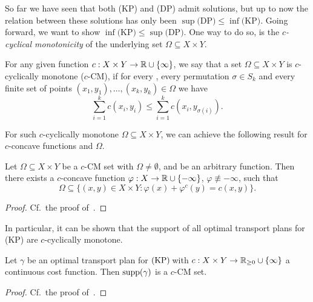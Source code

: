 So far we have seen that both (KP) and (DP) admit solutions, but up to now the relation between these solutions has only been $\sup \text{(DP)} \le \inf \text{(KP)}$. Going forward, we want to show $\inf \text{(KP)} \le \sup \text{(DP)}$. One way to do so, is the \textit{$c$-cyclical monotonicity} of the underlying set $\Omega \subseteq X \times Y$.

\begin{definition}\label{c-CM}
	For any given function $\map[c]{X \times{} Y}{\R \cup \{ \infty \}}$, we say that a set $\Omega \subseteq X \times Y$ is $c$-cyclically monotone ($c$-CM), if for every \NinN[k], every permutation $\sigma \in S_k$ and every finite set of points $(x_1, y_1), \dots, (x_k, y_k) \in \Omega$ we have
	\[ \sum\limits_{i = 1}^k c(x_i, y_i) \le \sum\limits_{i = 1}^k c(x_i, y_{\sigma(i)}). \]
\end{definition}

For such $c$-cyclically monotone $\Omega \subseteq X \times Y$, we can achieve the following result for $c$-concave functions and $\Omega$.

\begin{lemma}\label{c-CM-c-ConcExist}
	Let $\Omega \subseteq X \times Y$ be a $c$-CM set with $\Omega \neq \emptyset$, and  be an arbitrary function. Then there exists a $c$-concave function $\map[\varphi]{X}{\R \cup \{ - \infty \}}$, $\varphi \not\equiv -\infty$, such that
	\[ \Omega \subseteq \big\{ (x, y) \in X \times Y : \varphi(x) + \varphi^c(y) = c(x, y) \big\}. \]
\end{lemma}

\begin{proof}
	Cf.~the proof of\ \cite[Theorem~1.37]{San2015}.
\end{proof}

In particular, it can be shown that the support of all optimal transport plans for (KP) are $c$-cyclically monotone.

\begin{lemma}\label{OTPlanc-CM}
	Let $\gamma$ be an optimal transport plan for$\text{\normalfont\ (KP)\,}$with $\map[c]{X \times Y}{\RZero \cup \{ \infty \}}$ a continuous cost function. Then $\text{\normalfont{}supp}(\gamma)$ is a $c$-CM set.
\end{lemma}

\begin{proof}
	Cf.~the proof of\ \cite[Theorem~1.38]{San2015}.
\end{proof}

